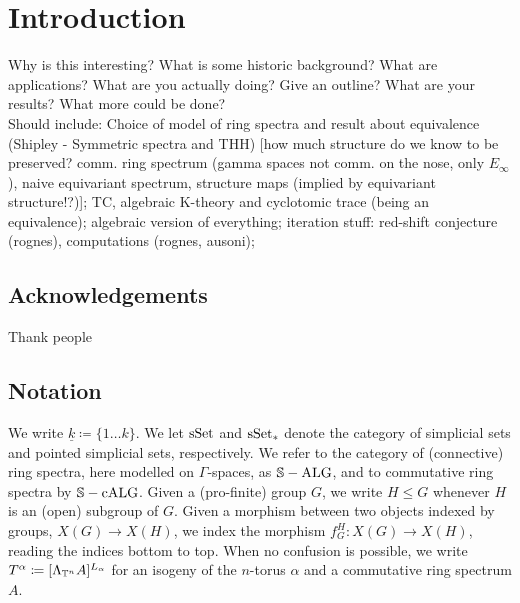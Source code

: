 \section{Introduction}
Why is this interesting? What is some historic background? What are applications? What are you actually doing? Give an outline? What are your results? What more could be done?\\
Should include: Choice of model of ring spectra and result about equivalence (Shipley - Symmetric spectra and THH) [how much structure do we know to be preserved? comm. ring spectrum (gamma spaces not comm. on the nose, only $E_\infty$), naive equivariant spectrum, structure maps (implied by equivariant structure!?)]; TC, algebraic K-theory and cyclotomic trace (being an equivalence); algebraic version of everything; iteration stuff: red-shift conjecture (rognes), computations (rognes, ausoni);
\subsection{Acknowledgements}
Thank people %
\subsection{Notation}
We write $\underline{k} \coloneqq \{1 \ldots k \}$. We let $\mathrm{sSet}$ and $\mathrm{sSet}_*$ denote the category of simplicial sets and pointed simplicial sets, respectively. We refer to the category of (connective) ring spectra, here modelled on $\Gamma$-spaces, as $\mathbb{S}-\mathrm{ALG}$, and to commutative ring spectra by $\mathbb{S}-\mathrm{cALG}$. Given a (pro-finite) group $G$, we write $H \leq G$ whenever $H$ is an (open) subgroup of $G$. Given a morphism between two objects indexed by groups, $X(G) \to X(H)$, we index the morphism $f_G^H: X(G) \to X(H)$, reading the indices bottom to top. When no confusion is possible, we write $T^\alpha \coloneqq [\Lambda_{\mathbb{T}^n} A]^{L_\alpha}$ for an isogeny of the $n$-torus $\alpha$ and a commutative ring spectrum $A$.